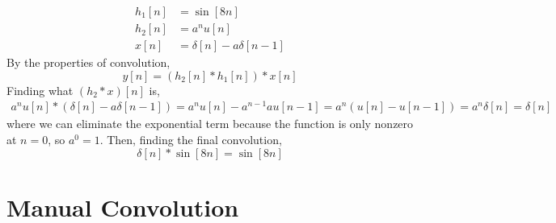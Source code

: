 \documentclass{article}
\begin{document}
\begin{align}
    h_1[n] &= \sin[8n] \\
    h_2[n] &= a^n u[n] \\
    x[n] &= \delta[n] - a \delta[n - 1]
\end{align}
By the properties of convolution,
\begin{equation}
    y[n] = (h_2[n] \ast h_1[n]) \ast x[n]
\end{equation}
Finding what \((h_2 \ast x)[n]\) is,
\begin{align}
    a^n u[n] \ast (\delta[n] - a\delta[n - 1]) = a^n u[n] - a^{n - 1} a u[n - 1] = a^n (u[n] - u[n - 1]) = a^n \delta[n] = \delta[n]
\end{align}
where we can eliminate the exponential term because the function is only nonzero at \(n = 0\), so \(a^0 = 1\).
Then, finding the final convolution,
\begin{equation}
    \delta[n] \ast \sin[8n] = \sin[8n]
\end{equation}

\section{Manual Convolution}

\subsection{}
\end{document}
